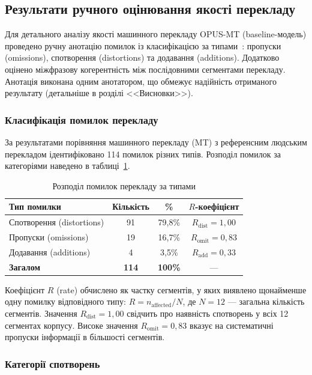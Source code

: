 \subsection{Результати ручного оцінювання якості перекладу}

Для детального аналізу якості машинного перекладу OPUS-MT (baseline-модель)
проведено ручну анотацію помилок із класифікацією за типами~\cite{mqm}:
пропуски (omissions), спотворення (distortions) та додавання (additions). Додатково оцінено
міжфразову когерентність між послідовними сегментами перекладу. Анотація
виконана одним анотатором, що обмежує надійність отриманого результату
(детальніше в розділі <<Висновки>>).

\subsubsection{Класифікація помилок перекладу}

За результатами порівняння машинного перекладу (MT) з референсним людським
перекладом ідентифіковано 114 помилок різних типів. Розподіл помилок за
категоріями наведено в таблиці~\ref{tab:error_distribution}.

\begin{table}[H]
\centering
\caption{Розподіл помилок перекладу за типами}
\label{tab:error_distribution}
\begin{tabular}{|l|c|c|c|}
\hline
\textbf{Тип помилки} & \textbf{Кількість} & \textbf{\%} & \textbf{$R$-коефіцієнт} \\
\hline
Спотворення (distortions) & 91 & 79,8\% & $R_{\text{dist}} = 1,00$ \\
Пропуски (omissions) & 19 & 16,7\% & $R_{\text{omit}} = 0,83$ \\
Додавання (additions) & 4 & 3,5\% & $R_{\text{add}} = 0,33$ \\
\hline
\textbf{Загалом} & \textbf{114} & \textbf{100\%} & --- \\
\hline
\end{tabular}
\end{table}

Коефіцієнт $R$ (rate) обчислено як частку сегментів, у яких виявлено
щонайменше одну помилку відповідного типу: $R = n_{\text{affected}} / N$,
де $N = 12$ --- загальна кількість сегментів. Значення $R_{\text{dist}} = 1,00$
свідчить про наявність спотворень у всіх 12 сегментах корпусу. Високе значення
$R_{\text{omit}} = 0,83$ вказує на систематичні пропуски інформації в більшості
сегментів.

\subsubsection{Категорії спотворень}

